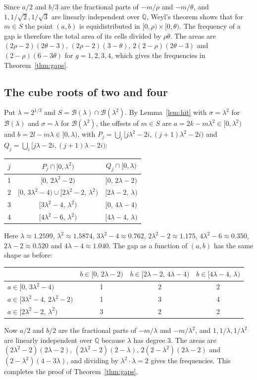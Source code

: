 \documentclass[12pt]{article}
\newcommand{\B}{\mathcal{B}}
\newcommand{\Q}{\mathbb{Q}}
\theoremstyle{plain}
\theoremstyle{remark}
\begin{document}
Since $a/2$ and $b/3$ are the fractional parts of $-m/\rho$ and $-m/\theta$, and
$1,1/\sqrt2,1/\sqrt3$ are linearly independent over $\Q$, Weyl's theorem shows that for
$m\in S$ the point $(a,b)$ is equidistributed in $[0,\rho)\times[0,\theta)$. The frequency of
a gap is therefore the total area of its cells divided by $\rho\theta$. The areas are
$(2\rho-2)(2\theta-3)$, $(2\rho-2)(3-\theta)$, $2(2-\rho)(2\theta-3)$ and
$(2-\rho)(6-3\theta)$ for $g=1,2,3,4$, which gives the frequencies in
Theorem~\ref{thm:gaps}.

\subsection{The cube roots of two and four}

Put $\lambda=2^{1/3}$ and $S=\B(\lambda)\cap\B(\lambda^2)$. By Lemma~\ref{lem:hit} with
$\sigma=\lambda^2$ for $\B(\lambda)$ and $\sigma=\lambda$ for $\B(\lambda^2)$, the offsets of
$m\in S$ are $a=2k-m\lambda^2\in[0,\lambda^2)$ and $b=2l-m\lambda\in[0,\lambda)$, with
$P_j=\bigcup_i[j\lambda^2-2i,(j+1)\lambda^2-2i)$ and
$Q_j=\bigcup_i[j\lambda-2i,(j+1)\lambda-2i)$:
\begin{center}
\begin{tabular}{ccc}
\toprule
$j$ & $P_j\cap[0,\lambda^2)$ & $Q_j\cap[0,\lambda)$\\
\midrule
1 & $[0,\,2\lambda^2-2)$ & $[0,\,2\lambda-2)$\\
2 & $[0,\,3\lambda^2-4)\cup[2\lambda^2-2,\,\lambda^2)$ & $[2\lambda-2,\,\lambda)$\\
3 & $[3\lambda^2-4,\,\lambda^2)$ & $[0,\,4\lambda-4)$\\
4 & $[4\lambda^2-6,\,\lambda^2)$ & $[4\lambda-4,\,\lambda)$\\
\bottomrule
\end{tabular}
\end{center}
Here $\lambda\approx1.2599$, $\lambda^2\approx1.5874$, $3\lambda^2-4\approx0.762$,
$2\lambda^2-2\approx1.175$, $4\lambda^2-6\approx0.350$, $2\lambda-2\approx0.520$ and
$4\lambda-4\approx1.040$. The gap as a function of $(a,b)$ has the same shape as before:
\begin{center}
\begin{tabular}{lccc}
\toprule
 & $b\in[0,\,2\lambda-2)$ & $b\in[2\lambda-2,\,4\lambda-4)$ & $b\in[4\lambda-4,\,\lambda)$\\
\midrule
$a\in[0,\,3\lambda^2-4)$ & 1 & 2 & 2\\
$a\in[3\lambda^2-4,\,2\lambda^2-2)$ & 1 & 3 & 4\\
$a\in[2\lambda^2-2,\,\lambda^2)$ & 3 & 2 & 2\\
\bottomrule
\end{tabular}
\end{center}
Now $a/2$ and $b/2$ are the fractional parts of $-m/\lambda$ and $-m/\lambda^2$, and
$1,1/\lambda,1/\lambda^2$ are linearly independent over $\Q$ because $\lambda$ has degree $3$.
The areas are $(2\lambda^2-2)(2\lambda-2)$, $(2\lambda^2-2)(2-\lambda)$,
$2(2-\lambda^2)(2\lambda-2)$ and $(2-\lambda^2)(4-3\lambda)$, and dividing by
$\lambda^2\cdot\lambda=2$ gives the frequencies. This completes the proof of
Theorem~\ref{thm:gaps}.
\end{document}
